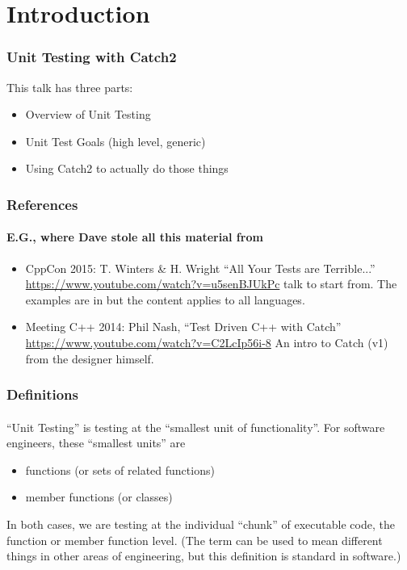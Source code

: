 \section{Introduction}

\begin{frame}[fragile]
\frametitle{Unit Testing with Catch2}

This talk has three parts:

\begin{itemize}
\item Overview of Unit Testing
\item Unit Test Goals (high level, generic)
\item Using Catch2 to actually do those things
\end{itemize}

\end{frame}


\begin{frame}[fragile]
\frametitle{References}
\framesubtitle{E.G., where Dave stole all this material from}

\begin{itemize}
\item CppCon 2015: T. Winters \& H. Wright ``All Your Tests are Terrible...''
  \url{https://www.youtube.com/watch?v=u5senBJUkPc}
   talk to start from.  The examples are in \CC but the
  content applies to all languages.
\vskip 6pt
\item Meeting C++ 2014: Phil Nash, ``Test Driven C++ with Catch''
  \url{https://www.youtube.com/watch?v=C2LcIp56i-8} An intro to Catch
  (v1) from the designer himself.

\end{itemize}

\end{frame}


\begin{frame}[fragile]
\frametitle{Definitions}
\framesubtitle{}
``Unit Testing'' is testing at the ``smallest unit of
functionality''.  For software engineers, these 
``smallest units'' are
\begin{itemize}
\item functions (or sets of related functions)
\item member functions (or classes)
\end{itemize}

In both cases, we are testing at the individual ``chunk'' of
executable code, the function or member function level.
\vskip 6pt
(The term can be used to mean different things in other areas of
engineering, but this definition is standard in software.)
\end{frame}

